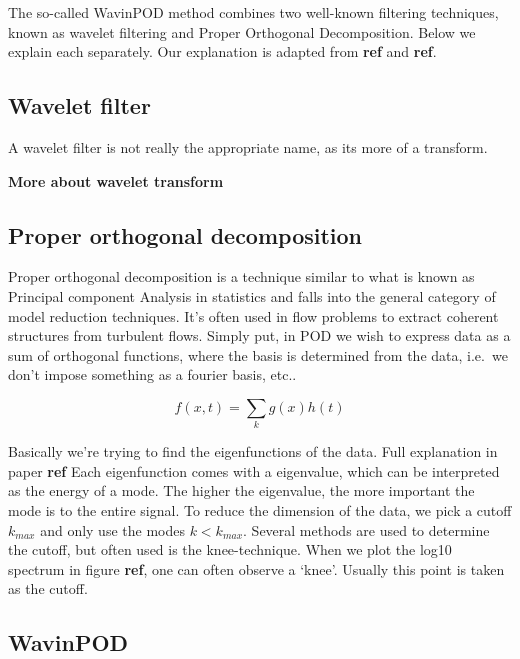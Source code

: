 \documentclass[12pt,a4paper,]{harvard-thesis}
\begin{document}
The so-called WavinPOD method combines two well-known filtering
techniques, known as wavelet filtering and Proper Orthogonal
Decomposition. Below we explain each separately. Our explanation is
adapted from \textbf{ref} and \textbf{ref}.

\hypertarget{wavelet-filter}{%
\subsection*{Wavelet filter}\label{wavelet-filter}}

A wavelet filter is not really the appropriate name, as its more of a
transform.

\textbf{More about wavelet transform}

\hypertarget{proper-orthogonal-decomposition}{%
\subsection*{Proper orthogonal
decomposition}\label{proper-orthogonal-decomposition}}

Proper orthogonal decomposition is a technique similar to what is known
as Principal component Analysis in statistics and falls into the general
category of model reduction techniques. It's often used in flow problems
to extract coherent structures from turbulent flows. Simply put, in POD
we wish to express data as a sum of orthogonal functions, where the
basis is determined from the data, i.e.~we don't impose something as a
fourier basis, etc..

\[
f(x,t)=\sum_k g(x)h(t)
\]

Basically we're trying to find the eigenfunctions of the data. Full
explanation in paper \textbf{ref} Each eigenfunction comes with a
eigenvalue, which can be interpreted as the energy of a mode. The higher
the eigenvalue, the more important the mode is to the entire signal. To
reduce the dimension of the data, we pick a cutoff \(k_{max}\) and only
use the modes \(k<k_{max}\). Several methods are used to determine the
cutoff, but often used is the knee-technique. When we plot the log10
spectrum in figure \textbf{ref}, one can often observe a `knee'. Usually
this point is taken as the cutoff.

\hypertarget{wavinpod}{%
\subsection*{WavinPOD}\label{wavinpod}}
\end{document}
